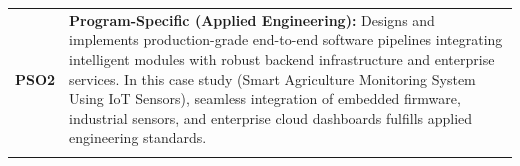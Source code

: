 {\begin{longtable}{@{}>{\centering\arraybackslash}p{1.8cm} p{13.2cm}@{}}
    \addlinespace
\textbf{PSO2} & \textbf{Program-Specific (Applied Engineering):} Designs and implements production-grade end-to-end software pipelines integrating intelligent modules with robust backend infrastructure and enterprise services. In this case study (Smart Agriculture Monitoring System Using IoT Sensors), seamless integration of embedded firmware, industrial sensors, and enterprise cloud dashboards fulfills applied engineering standards. \\
    \addlinespace
    \bottomrule
\end{longtable}}